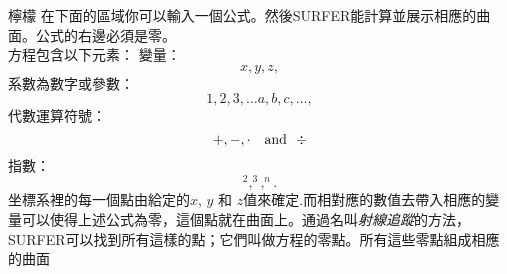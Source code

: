 \begin{surferPage}{檸檬}
在下面的區域你可以輸入一個公式。然後SURFER能計算並展示相應的曲面。公式的右邊必須是零。
\\
方程包含以下元素：
\newline
變量：
\[x, y, z, \]
系數為數字或參數：
\[1, 2, 3, \dots a, b, c, \dots, \]
代數運算符號：
\[+,  - , \cdot \quad \textnormal{and}\ \ \div\]
指數：
\[ ^2, ^3, ^n .\]
坐標系裡的每一個點由給定的$x$, $y$ 和 $z$值來確定.而相對應的數值去帶入相應的變量可以使得上述公式為零，這個點就在曲面上。通過名叫\textit{射線追蹤}的方法，SURFER可以找到所有這樣的點；它們叫做方程的零點。所有這些零點組成相應的曲面
\end{surferPage}
